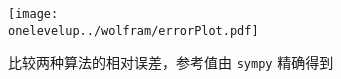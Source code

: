 \documentclass[preview,10pt,border=8pt]{standalone}
\begin{document}
\begin{figure}[!t]
	\centering
	\hspace{5em}\texttt{[image: \\onelevelup../wolfram/errorPlot.pdf]}
	\caption*{比较两种算法的相对误差，参考值由 \texttt{sympy} 精确得到}
\end{figure}
\end{document}
